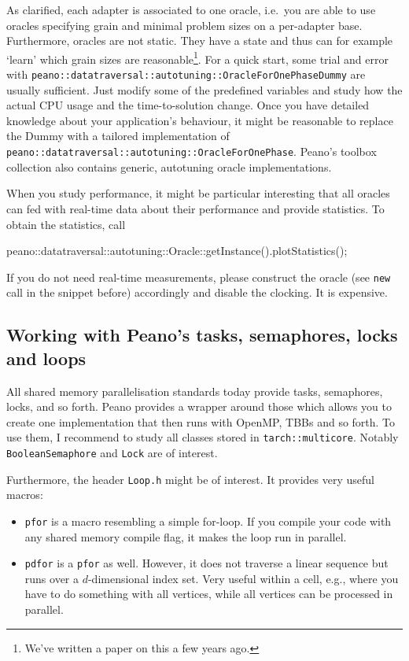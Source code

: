 \noindent
As clarified, each adapter is associated to one oracle, i.e.~you are able to
use oracles specifying grain and minimal problem sizes on a per-adapter base.
Furthermore, oracles are not static.
They have a state and thus can for example `learn' which grain sizes are
reasonable\footnote{We've written a paper on this a few years ago.}.
For a quick start, some trial and error with
\texttt{peano::datatraversal::autotuning::OracleForOnePhaseDummy} are usually
sufficient.
Just modify some of the predefined variables and study how the actual CPU usage
and the time-to-solution change.
Once you have detailed knowledge about your application's behaviour, it might
be reasonable to replace the Dummy with a tailored implementation of
\texttt{peano::datatraversal::autotuning::OracleForOnePhase}.
Peano's toolbox collection also contains generic, autotuning oracle
implementations.


When you study performance, it might be particular interesting that all oracles
can fed with real-time data about their performance and provide statistics. To
obtain the statistics, call
\begin{code}
  peano::datatraversal::autotuning::Oracle::getInstance().plotStatistics();
\end{code}
\noindent
If you do not need real-time measurements, please construct the oracle (see
\texttt{new} call in the snippet before) accordingly and disable the clocking.
It is expensive.


\subsection{Working with Peano's tasks, semaphores, locks and loops}

All shared memory parallelisation standards today provide tasks, semaphores,
locks, and so forth.
Peano provides a wrapper around those which allows you to create one
implementation that then runs with OpenMP, TBBs and so forth.
To use them, I recommend to study all classes stored in
\texttt{tarch::multicore}.
Notably \texttt{BooleanSemaphore} and \texttt{Lock} are of interest.

Furthermore, the header \texttt{Loop.h} might be of interest. 
It provides very useful macros:
\begin{itemize}
  \item \texttt{pfor} is a macro resembling a simple for-loop. If you compile
  your code with any shared memory compile flag, it makes the loop run in
  parallel.
  \item \texttt{pdfor} is a \texttt{pfor} as well. However, it does not traverse
  a linear sequence but runs over a $d$-dimensional index set. Very useful
  within a cell, e.g., where you have to do something with all vertices, while
  all vertices can be processed in parallel.
\end{itemize}

